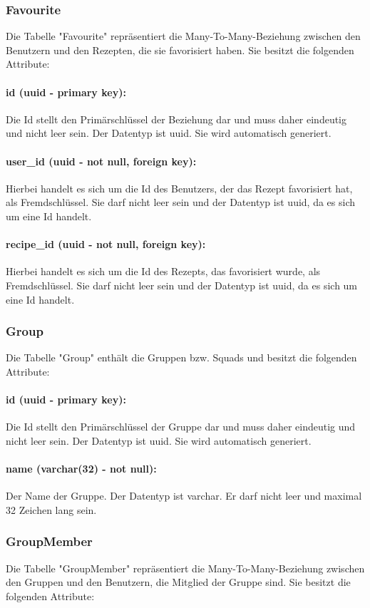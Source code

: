 \documentclass[parskip=full]{scrartcl}
\begin{document}
\subsubsection{Favourite}
Die Tabelle "Favourite" repräsentiert die Many-To-Many-Beziehung zwischen den Benutzern und den Rezepten, die sie favorisiert haben. Sie besitzt die folgenden Attribute:
\paragraph{id (uuid - primary key):} Die Id stellt den Primärschlüssel der Beziehung dar und muss daher eindeutig und nicht leer sein. Der Datentyp ist \Gls{uuid}. Sie wird automatisch generiert.
\paragraph{user\_id (uuid - not null, foreign key):} Hierbei handelt es sich um die Id des Benutzers, der das Rezept favorisiert hat, als Fremdschlüssel. Sie darf nicht leer sein und der Datentyp ist \Gls{uuid}, da es sich um eine Id handelt.
\paragraph{recipe\_id (uuid - not null, foreign key):} Hierbei handelt es sich um die Id des Rezepts, das favorisiert wurde, als Fremdschlüssel. Sie darf nicht leer sein und der Datentyp ist \Gls{uuid}, da es sich um eine Id handelt.
\newpage
\subsubsection{Group}
Die Tabelle "Group" enthält die Gruppen bzw. Squads und besitzt die folgenden Attribute:
\paragraph{id (uuid - primary key):} Die Id stellt den Primärschlüssel der Gruppe dar und muss daher eindeutig und nicht leer sein. Der Datentyp ist \Gls{uuid}. Sie wird automatisch generiert.
\paragraph{name (varchar(32) - not null):} Der Name der Gruppe. Der Datentyp ist \Gls{varchar}. Er darf nicht leer und maximal 32 Zeichen lang sein.
\newpage
\subsubsection{GroupMember}
Die Tabelle "GroupMember" repräsentiert die Many-To-Many-Beziehung zwischen den Gruppen und den Benutzern, die Mitglied der Gruppe sind. Sie besitzt die folgenden Attribute:
\end{document}
